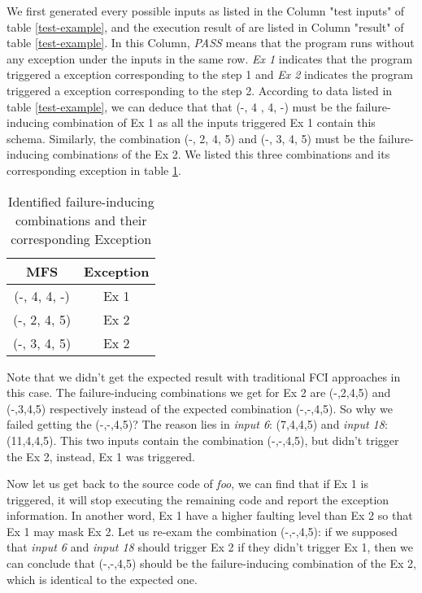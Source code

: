 \documentclass{sig-alternate}
\begin{document}
We first generated every possible inputs as listed in the Column "test inputs" of table \ref{test-example}, and the execution result of are listed in Column "result" of table \ref{test-example}. In this Column, \emph{PASS} means that the program runs without any exception under the inputs in the same row. \emph{Ex 1} indicates that the program triggered a exception corresponding to the step 1 and \emph{Ex 2} indicates the program triggered a exception corresponding to the step 2. According to data listed in table \ref{test-example}, we can deduce that that (-, 4 , 4, -) must be the failure-inducing combination of Ex 1 as all the inputs triggered Ex 1 contain this schema. Similarly, the combination (-, 2, 4, 5) and  (-, 3, 4, 5) must be the failure-inducing combinations of the Ex 2. We listed this three combinations and its corresponding exception in table \ref{identify-example}.

\begin{table}
\centering
\caption{Identified failure-inducing combinations and their corresponding Exception}
\label{identify-example}
\begin{tabular}{|c|c|} \hline
MFS & Exception\\ \hline
(-, 4, 4, -) &  Ex 1\\ \hline
(-, 2, 4, 5) &  Ex 2\\ \hline
(-, 3, 4, 5) &  Ex 2\\ \hline
\hline\end{tabular}
\end{table}

Note that we didn't get the expected result with traditional FCI approaches in this case. The failure-inducing combinations we get for Ex 2 are (-,2,4,5) and (-,3,4,5) respectively instead of the expected combination (-,-,4,5). So why we failed getting the (-,-,4,5)? The reason lies in \emph{input 6}: (7,4,4,5) and \emph{input 18}: (11,4,4,5). This two inputs contain the combination (-,-,4,5), but didn't trigger the Ex 2, instead,  Ex 1 was triggered.

Now let us get back to the source code of \emph{foo}, we can find that if Ex 1 is triggered, it will stop executing the remaining code and report the exception information. In another word, Ex 1 have a higher faulting level than Ex 2 so that Ex 1 may mask Ex 2. Let us re-exam the combination (-,-,4,5): if we supposed that \emph{input 6} and \emph{input 18} should trigger Ex 2 if they didn't trigger Ex 1, then we can conclude that (-,-,4,5) should be the failure-inducing combination of the Ex 2, which is identical to the expected one.
\end{document}
